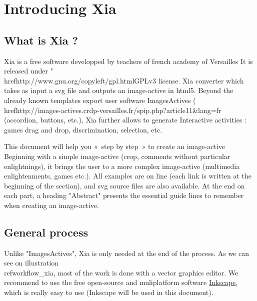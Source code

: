 

 
 \tableofcontents
 
 
\section{Introducing Xia}

\subsection{What is Xia ?}

Xia is a free software developped by teachers of french academy of Versailles
It is released under "\\href{http://www.gnu.org/copyleft/gpl.html}{GPLv3} license.
Xia converter which takes as input a svg file and outputs an image-active in 
html5. Beyond the already known templates export user software ImagesActives 
(\\href{http://images-actives.crdp-versailles.fr/spip.php?article11&lang=fr}
{(accordion, buttons, etc.}), Xia further allows to generate
Interactive activities : games drag and drop, discrimination, selection, etc.

This document will help you «~step by step~» to create an image-active
Beginning with a simple image-active (crop, comments without particular 
enlightnings), it brings the user to a more complex image-active (multimedia
 enlightenments, games etc.). All examples are on line (each link is written at 
the beginning of the section), and svg source files are also available. At the end
on each part, a heading "Abstract" presents the essential guide lines to 
remember when creating an image-active.
\subsection{General process}

Unlike "ImagesActives", Xia is only needed at the end of the process.
As we can see on illustration \\ref{workflow_xia}, most of the work is done with 
a  vector graphics editor. We recommend to use the free open-source and 
muliplatform software \href{http://www.inkscape.org/}{Inkscape}, which is 
really easy to use (Inkscape will be used in this document).

